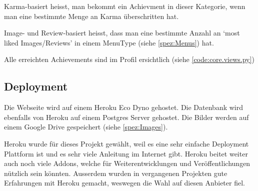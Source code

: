 Karma-basiert heisst, man bekommt ein Achievment in dieser Kategorie, wenn man
eine bestimmte Menge an Karma überschritten hat.

Image- und Review-basiert heisst, dass man eine bestimmte Anzahl an `most liked
Images/Reviews' in einem MenuType (siehe \ref{spez:Menus}) hat.

Alle erreichten Achievements sind im Profil ersichtlich (siehe \ref{code:core.views.py})

\subsection{Deployment} \label{spez:Deployment}

Die Webseite wird auf einem Heroku Eco Dyno gehostet. Die Datenbank wird ebenfalls
von Heroku auf einem Postgres Server gehostet. Die Bilder werden auf einem
Google Drive gespeichert (siehe \ref{spez:Images}).

Heroku wurde für dieses Projekt gewählt, weil es eine sehr einfache
 Deployment Plattform ist und es sehr viele Anleitung im Internet
gibt. Heroku beitet weiter auch noch viele Addons, welche für
Weiterentwicklungen und Veröffentlichungen nützlich sein könnten. Ausserdem
wurden in vergangenen Projekten gute Erfahrungen mit Heroku gemacht, weswegen
die Wahl auf diesen Anbieter fiel.
